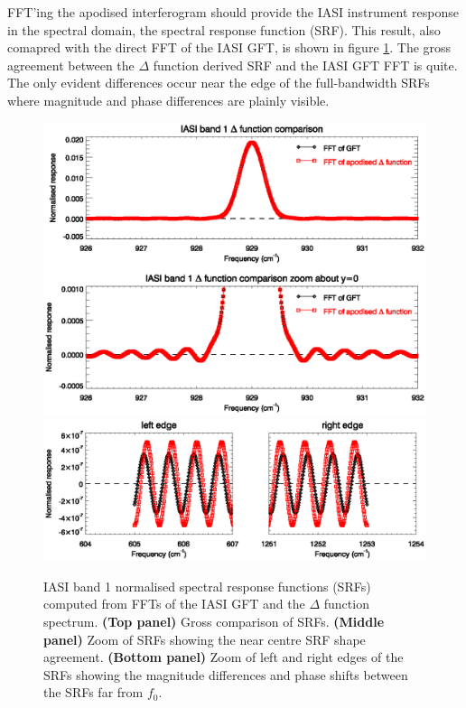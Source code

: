 FFT'ing the apodised interferogram should provide the IASI instrument response in the spectral domain, the spectral response function (SRF). This result, also comapred with the direct FFT of the IASI GFT, is shown in figure \ref{fig:band1_deltafn_srfs}. The gross agreement between the $\Delta$ function derived SRF and the IASI GFT FFT is quite. The only evident differences occur near the edge of the full-bandwidth SRFs where magnitude and phase differences are plainly visible.

\begin{figure}[htp]
  \centering
  \includegraphics[scale=0.8]{graphics/band1_deltafn_srfs1.eps}
  \includegraphics[scale=0.8]{graphics/band1_deltafn_srfs2.eps}
  \caption{IASI band 1 normalised spectral response functions (SRFs) computed from FFTs of the IASI GFT and the $\Delta$ function spectrum. \textbf{(Top panel)} Gross comparison of SRFs. \textbf{(Middle panel)} Zoom of SRFs showing the near centre SRF shape agreement. \textbf{(Bottom panel)} Zoom of left and right edges of the SRFs showing the magnitude differences and phase shifts between the SRFs far from $f_{0}$.}
  \label{fig:band1_deltafn_srfs}
\end{figure}

